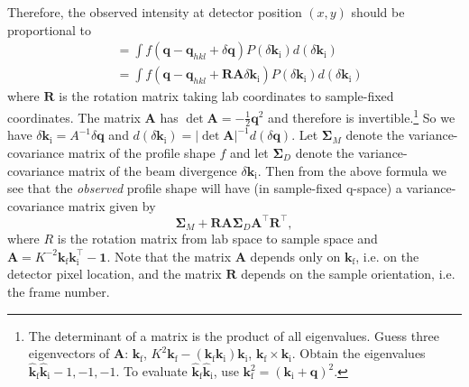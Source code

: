 \documentclass[11pt,a4paper]{article}
\let\oldhat\hat
\renewcommand{\hat}[1]{\oldhat{\mathbf{#1}}}
\def\v#1{\bm{{#1}}}
\def\tr{^\intercal}
\def\si{\text{i}}
\def\sf{\text{f}}
\def\k{{\v{k}}}
\def\hk{{\v{\hat k}}}
\def\q{{\v{q}}}
\begin{document}
Therefore, the observed intensity at detector position $(x,y)$ should be proportional to
\begin{align}
  &= \int f(\q - \q_{hkl} + \delta \q) P(\delta \k_\si) d(\delta \k_\si) \\
  &= \int f(\q - \q_{hkl} + \v{R}\v{A} \delta \k_\si) P(\delta \k_\si) d(\delta \k_\si)
\end{align}
where $\v{R}$ is the rotation matrix taking lab coordinates to sample-fixed coordinates.
The matrix $\v{A}$ has $\det \v{A} = -\frac{1}{2}\q^2$
and therefore is invertible.\footnote
{The determinant of a matrix is the product of all eigenvalues.
Guess three eigenvectors of $\v{A}$:
$\k_\sf$, $K^2\k_\sf-(\k_\sf\k_\si)\k_\si$, $\k_\sf\times\k_\si$.
Obtain the eigenvalues $\hk_\sf\hk_\si-1,-1,-1$.
To evaluate $\hk_\sf\hk_\si$, use $\k_\sf^2=(\k_\si+\q)^2$.}
So we have
$\delta \k_\si = A^{-1} \delta \q$ and $d(\delta \k_\si) = |\det \v{A}|^{-1} d(\delta \q)$.
Let $\v\Sigma_M$ denote the variance-covariance matrix of the profile shape $f$
and let $\v\Sigma_D$ denote the variance-covariance matrix of the beam divergence $\delta \k_\si$.
Then from the above formula we see that the \emph{observed} profile shape will have
(in sample-fixed q-space) a variance-covariance matrix given by
\begin{equation}\label{ESigmaMD}
  \v\Sigma_M + \v{R} \v{A} \v\Sigma_D \v{A}\tr \v{R}\tr,
\end{equation}
where $R$ is the rotation matrix from lab space to sample space
and $\v{A} = K^{-2} \k_\sf \k_\si\tr - \v1$.
Note that the matrix $\v{A}$ depends only on $\k_\sf$, i.e. on the detector pixel location,
and the matrix $\v{R}$ depends on the sample orientation, i.e. the frame number.
\end{document}

